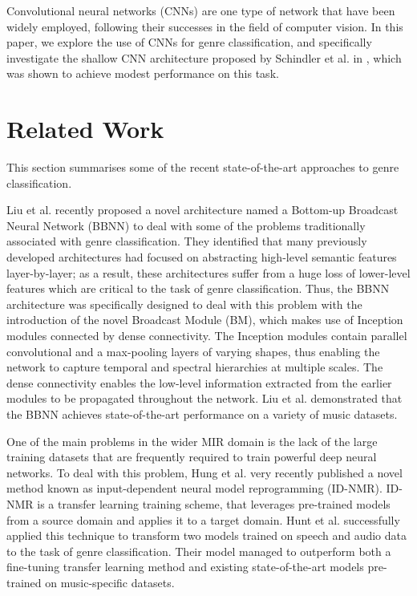 \documentclass[conference]{IEEEtran}
\begin{document}
Convolutional neural networks (CNNs) are one type of network that have been widely employed, following their successes in the field of computer vision.
In this paper, we explore the use of CNNs for genre classification, and specifically investigate the shallow CNN architecture proposed by Schindler et al. in \cite{SchindlerLidyRauber}, which was shown to achieve modest performance on this task.

\section{Related Work}

This section summarises some of the recent state-of-the-art approaches to genre classification.

Liu et al. \cite{LiuFengLiuWangLiu} recently proposed a novel architecture named a Bottom-up Broadcast Neural Network (BBNN) to deal with some of the problems traditionally associated with genre classification.
They identified that many previously developed architectures had focused on abstracting high-level semantic features layer-by-layer; as a result, these architectures suffer from a huge loss of lower-level features which are critical to the task of genre classification.
Thus, the BBNN architecture was specifically designed to deal with this problem with the introduction of the novel Broadcast Module (BM), which makes use of Inception modules connected by dense connectivity.
The Inception modules contain parallel convolutional and a max-pooling layers of varying shapes, thus enabling the network to capture temporal and spectral hierarchies at multiple scales.
The dense connectivity enables the low-level information extracted from the earlier modules to be propagated throughout the network.
Liu et al. demonstrated that the BBNN achieves state-of-the-art performance on a variety of music datasets.

One of the main problems in the wider MIR domain is the lack of the large training datasets that are frequently required to train powerful deep neural networks.
To deal with this problem, Hung et al. \cite{HungYangChenLerch} very recently published a novel method known as input-dependent neural model reprogramming (ID-NMR).
ID-NMR is a transfer learning training scheme, that leverages pre-trained models from a source domain and applies it to a target domain.
Hunt et al. successfully applied this technique to transform two models trained on speech and audio data to the task of genre classification.
Their model managed to outperform both a fine-tuning transfer learning method and existing state-of-the-art models pre-trained on music-specific datasets.
\end{document}
